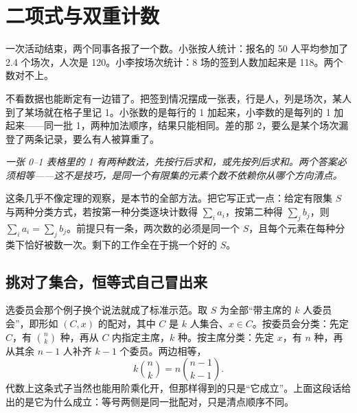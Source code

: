 \section{二项式与双重计数}
\label{sec:04-Discrete-Mathematics/01-Combinatorics/02}

一次活动结束，两个同事各报了一个数。小张按人统计：报名的 50 人平均参加了 2.4 个场次，人次是 120。小李按场次统计：8 场的签到人数加起来是 118。两个数对不上。

不看数据也能断定有一边错了。把签到情况摆成一张表，行是人，列是场次，某人到了某场就在格子里记 1。小张数的是每行的 1 加起来，小李数的是每列的 1 加起来——同一批 1，两种加法顺序，结果只能相同。差的那 2，要么是某个场次漏登了两条记录，要么有人被算重了。

\begin{center}

\emph{一张 0--1 表格里的 1 有两种数法，先按行后求和，或先按列后求和。两个答案必须相等——这不是技巧，是同一个有限集的元素个数不依赖你从哪个方向清点。}
\end{center}

这条几乎不像定理的观察，是本节的全部方法。把它写正式一点：给定有限集 \(S\) 与两种分类方式，若按第一种分类逐块计数得 \(\sum_i a_i\)，按第二种得 \(\sum_j b_j\)，则 \(\sum_i a_i=\sum_j b_j\)。前提只有一条，两次数的必须是同一个 \(S\)，且每个元素在每种分类下恰好被数一次。剩下的工作全在于挑一个好的 \(S\)。

\subsection{挑对了集合，恒等式自己冒出来}

选委员会那个例子换个说法就成了标准示范。取 \(S\) 为全部``带主席的 \(k\) 人委员会''，即形如 \((C,x)\) 的配对，其中 \(C\) 是 \(k\) 人集合、\(x\in C\)。按委员会分类：先定 \(C\)，有 \(\binom nk\) 种，再从 \(C\) 内指定主席，\(k\) 种。按主席分类：先定 \(x\)，有 \(n\) 种，再从其余 \(n-1\) 人补齐 \(k-1\) 个委员。两边相等，
\[
k\binom nk=n\binom{n-1}{k-1}.
\]
代数上这条式子当然也能用阶乘化开，但那样得到的只是``它成立''。上面这段话给出的是它为什么成立：等号两侧是同一批配对，只是清点顺序不同。

